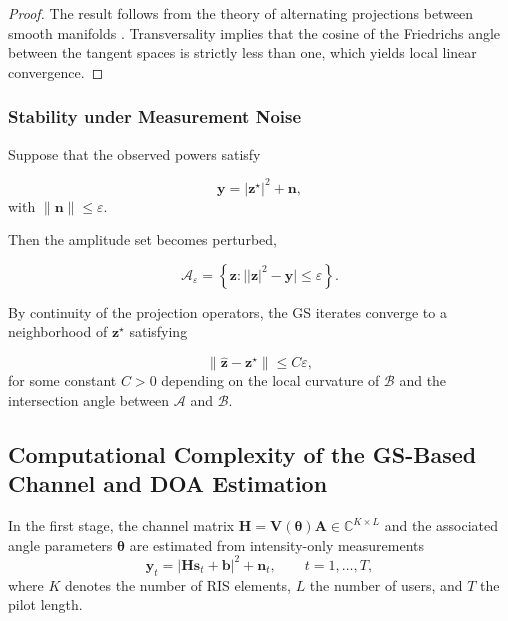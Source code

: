\documentclass[journal]{IEEEtran}
\begin{document}
\begin{proof}
The result follows from the theory of alternating projections between smooth
manifolds \cite{bauschke2003projection}. Transversality implies that the cosine %
of the Friedrichs angle between the tangent spaces is strictly less than one,
which yields local linear convergence.
\end{proof}

\subsubsection{Stability under Measurement Noise}

Suppose that the observed powers satisfy

\begin{equation}
\mathbf y
=
|\mathbf z^\star|^2+\mathbf n,
\end{equation}
with $\|\mathbf n\|\le \varepsilon$.

Then the amplitude set becomes perturbed,

\begin{equation}
\mathcal A_\varepsilon
=
\left\{
\mathbf z : \big||\mathbf z|^2-\mathbf y\big|\le \varepsilon
\right\}.
\end{equation}

By continuity of the projection operators, the GS iterates converge to a
neighborhood of $\mathbf z^\star$ satisfying

\begin{equation}
\|\hat{\mathbf z}-\mathbf z^\star\|
\le
C\varepsilon ,
\end{equation}
for some constant $C>0$ depending on the local curvature of $\mathcal B$ and the
intersection angle between $\mathcal A$ and $\mathcal B$.


\subsection{Computational Complexity of the GS-Based Channel and DOA Estimation}

In the first stage, the channel matrix 
$\mathbf H = \mathbf V(\boldsymbol\theta)\mathbf A \in \mathbb C^{K\times L}$
and the associated angle parameters $\boldsymbol\theta$ are estimated from
intensity-only measurements
\begin{equation}
\mathbf y_t = \left|\mathbf H\mathbf s_t + \mathbf b\right|^2 + \mathbf n_t,
\qquad t=1,\ldots,T,
\end{equation}
where $K$ denotes the number of RIS elements, $L$ the number of users,
and $T$ the pilot length.
\end{document}
